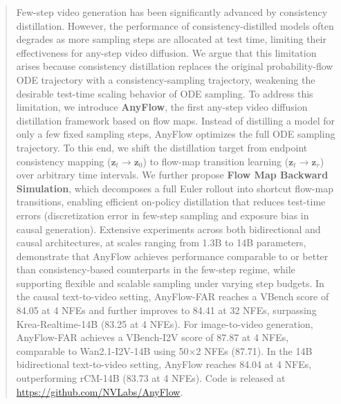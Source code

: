 \begin{abstract}
  Few-step video generation has been significantly advanced by consistency distillation.
  However, the performance of consistency-distilled models often degrades as more sampling steps are allocated at test time, limiting their effectiveness for any-step video diffusion.
  We argue that this limitation arises because consistency distillation replaces the original probability-flow ODE trajectory with a consistency-sampling trajectory, weakening the desirable test-time scaling behavior of ODE sampling.
  To address this limitation, we introduce \textbf{AnyFlow}, the first any-step video diffusion distillation framework based on flow maps.
  Instead of distilling a model for only a few fixed sampling steps, AnyFlow optimizes the full ODE sampling trajectory.
  To this end, we shift the distillation target from endpoint consistency mapping ($\mathbf{z}_t\!\to\!\mathbf{z}_0$) to flow-map transition learning ($\mathbf{z}_t\!\to\!\mathbf{z}_r$) over arbitrary time intervals.
  We further propose \textbf{Flow Map Backward Simulation}, which decomposes a full Euler rollout into shortcut flow-map transitions, enabling efficient on-policy distillation that reduces test-time errors (\ie discretization error in few-step sampling and exposure bias in causal generation).
  Extensive experiments across both bidirectional and causal architectures, at scales ranging from 1.3B to 14B parameters, demonstrate that AnyFlow achieves performance comparable to or better than consistency-based counterparts in the few-step regime, while supporting flexible and scalable sampling under varying step budgets. In the causal text-to-video setting, AnyFlow-FAR reaches a VBench score of 84.05 at 4 NFEs and further improves to 84.41 at 32 NFEs, surpassing Krea-Realtime-14B (83.25 at 4 NFEs). For image-to-video generation, AnyFlow-FAR achieves a VBench-I2V score of 87.87 at 4 NFEs, comparable to Wan2.1-I2V-14B using 50$\times$2 NFEs (87.71). In the 14B bidirectional text-to-video setting, AnyFlow reaches 84.04 at 4 NFEs, outperforming rCM-14B (83.73 at 4 NFEs).
  Code is released at \url{https://github.com/NVLabs/AnyFlow}.
\end{abstract}
